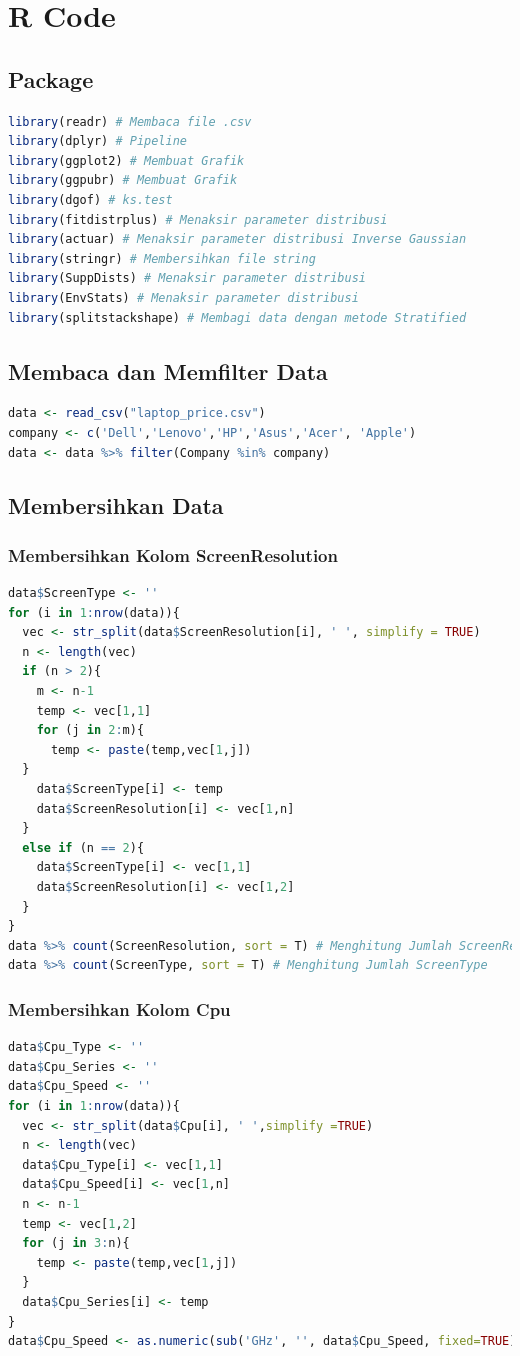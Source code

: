 \documentclass[12pt]{article}
\begin{document}
\section{R Code}
\subsection{Package}
\begin{lstlisting}[language=R]
library(readr) # Membaca file .csv
library(dplyr) # Pipeline
library(ggplot2) # Membuat Grafik
library(ggpubr) # Membuat Grafik
library(dgof) # ks.test
library(fitdistrplus) # Menaksir parameter distribusi 
library(actuar) # Menaksir parameter distribusi Inverse Gaussian
library(stringr) # Membersihkan file string
library(SuppDists) # Menaksir parameter distribusi 
library(EnvStats) # Menaksir parameter distribusi 
library(splitstackshape) # Membagi data dengan metode Stratified
\end{lstlisting}
\subsection{Membaca dan Memfilter Data}
\begin{lstlisting}[language=R]
data <- read_csv("laptop_price.csv")
company <- c('Dell','Lenovo','HP','Asus','Acer', 'Apple')
data <- data %>% filter(Company %in% company)
\end{lstlisting}
\subsection{Membersihkan Data}
\subsubsection{Membersihkan Kolom ScreenResolution}
\begin{lstlisting}[language=R]
data$ScreenType <- ''
for (i in 1:nrow(data)){
  vec <- str_split(data$ScreenResolution[i], ' ', simplify = TRUE)
  n <- length(vec)
  if (n > 2){
    m <- n-1
    temp <- vec[1,1]
    for (j in 2:m){
      temp <- paste(temp,vec[1,j])
  }
    data$ScreenType[i] <- temp
    data$ScreenResolution[i] <- vec[1,n]
  }
  else if (n == 2){
    data$ScreenType[i] <- vec[1,1]
    data$ScreenResolution[i] <- vec[1,2]
  }
}
data %>% count(ScreenResolution, sort = T) # Menghitung Jumlah ScreenResolution
data %>% count(ScreenType, sort = T) # Menghitung Jumlah ScreenType
\end{lstlisting}
\subsubsection{Membersihkan Kolom Cpu}
\begin{lstlisting}[language=R]
data$Cpu_Type <- ''
data$Cpu_Series <- ''
data$Cpu_Speed <- ''
for (i in 1:nrow(data)){
  vec <- str_split(data$Cpu[i], ' ',simplify =TRUE)
  n <- length(vec)
  data$Cpu_Type[i] <- vec[1,1]
  data$Cpu_Speed[i] <- vec[1,n]
  n <- n-1
  temp <- vec[1,2]
  for (j in 3:n){
    temp <- paste(temp,vec[1,j])
  }
  data$Cpu_Series[i] <- temp
}
data$Cpu_Speed <- as.numeric(sub('GHz', '', data$Cpu_Speed, fixed=TRUE))
\end{lstlisting}
\end{document}
